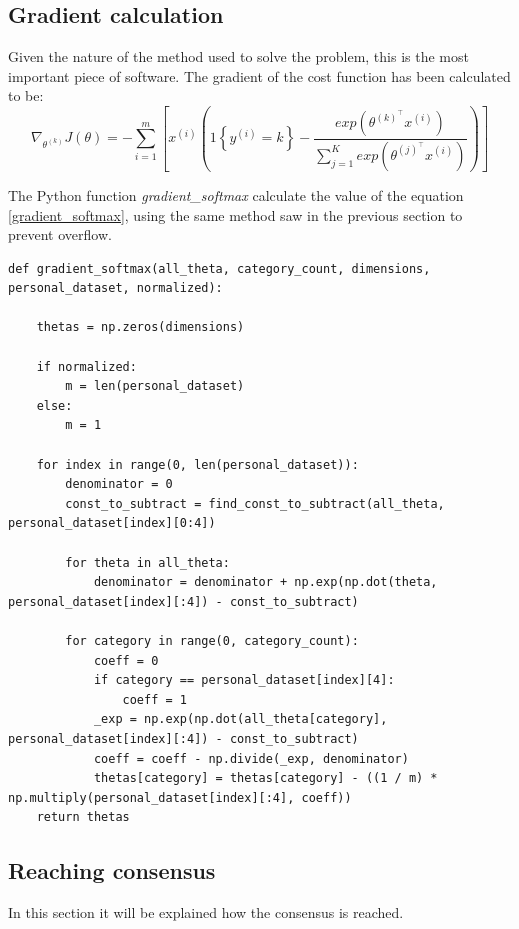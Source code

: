 \documentclass[a4paper,11pt,oneside]{book}
\begin{document}
\subsection{Gradient calculation}
Given the nature of the method used to solve the problem, this is the most important piece of software. The gradient of the cost function has been calculated to be:
\begin{equation}
	\nabla_{\theta^{(k)}}J(\theta) = - \sum_{i=1}^{m} \left[ x^{(i)} \left( 1 \left\{ y^{(i)}=k \right\} -     \dfrac{exp\left(\theta^{(k)^{\top}}x^{(i)} \right)}{ \sum_{j=1}^{K} exp\left(\theta^{(j)^{\top}}x^{(i)} \right)}      \right) \right]
	\label{gradient_softmax}
\end{equation}

The Python function \textit{gradient\_softmax} calculate the value of the equation \ref{gradient_softmax}, using the same method saw in the previous section to prevent overflow.

\begin{lstlisting}
def gradient_softmax(all_theta, category_count, dimensions, personal_dataset, normalized):

    thetas = np.zeros(dimensions)

    if normalized:
        m = len(personal_dataset)
    else:
        m = 1

    for index in range(0, len(personal_dataset)):
        denominator = 0
        const_to_subtract = find_const_to_subtract(all_theta, personal_dataset[index][0:4])

        for theta in all_theta:
            denominator = denominator + np.exp(np.dot(theta, personal_dataset[index][:4]) - const_to_subtract)

        for category in range(0, category_count):
            coeff = 0
            if category == personal_dataset[index][4]:
                coeff = 1
            _exp = np.exp(np.dot(all_theta[category], personal_dataset[index][:4]) - const_to_subtract)
            coeff = coeff - np.divide(_exp, denominator)
            thetas[category] = thetas[category] - ((1 / m) * np.multiply(personal_dataset[index][:4], coeff))
    return thetas
\end{lstlisting}

\subsection {Reaching consensus}

In this section it will be explained how the consensus is reached.\\
\end{document}
